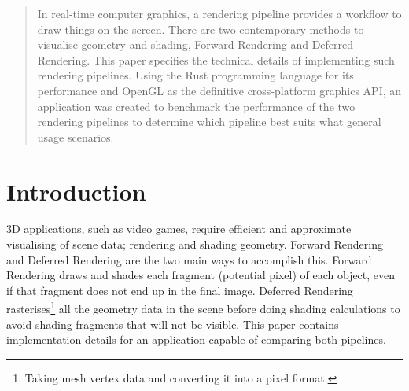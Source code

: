 
\begin{abstract}
  In real-time computer graphics, a rendering pipeline provides a workflow to draw things on the screen.
  There are two contemporary methods to visualise geometry and shading, Forward Rendering and Deferred Rendering.
  This paper specifies the technical details of implementing such rendering pipelines.
  Using the Rust programming language for its performance and OpenGL as the definitive cross-platform graphics API, an application was created to benchmark the performance of the two rendering pipelines to determine which pipeline best suits what general usage scenarios.
\end{abstract}

\newpage


\tableofcontents
\newpage
{}


\section{Introduction}
3D applications, such as video games, require efficient and approximate visualising of scene data; rendering and shading geometry.
Forward Rendering and Deferred Rendering are the two main ways to accomplish this.
Forward Rendering draws and shades each fragment (potential pixel) of each object, even if that fragment does not end up in the final image.
Deferred Rendering rasterises\footnote{Taking mesh vertex data and converting it into a pixel format.} all the geometry data in the scene before doing shading calculations to avoid shading fragments that will not be visible.
This paper contains implementation details for an application capable of comparing both pipelines.

